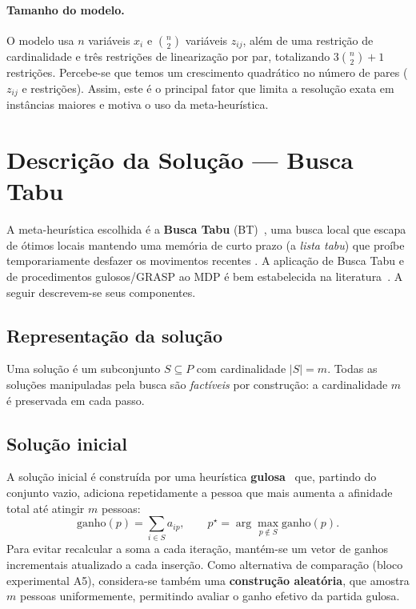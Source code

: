 \documentclass[a4paper,11pt]{article}
\begin{document}
\paragraph{Tamanho do modelo.}
O modelo usa $n$ variáveis $x_i$ e $\binom{n}{2}$ variáveis $z_{ij}$, além de uma
restrição de cardinalidade e três restrições de linearização por par, totalizando
$3\binom{n}{2} + 1$ restrições. Percebe-se que temos um crescimento quadrático no número de pares ($z_{ij}$ e
restrições). Assim, este é o principal fator que limita a resolução exata em instâncias maiores e
motiva o uso da meta-heurística.

\section{Descrição da Solução --- Busca Tabu}
\label{sec:solucao}

A meta-heurística escolhida é a \textbf{Busca Tabu} (BT)~\cite{glover1989tabu,glover1997tabu},
uma busca local que escapa de ótimos locais mantendo uma memória de curto prazo (a
\emph{lista tabu}) que proíbe temporariamente desfazer os movimentos recentes
\cite{hertz1995tutorial,gendreau2003intro,ritt2024inf05010}. A aplicação de Busca Tabu e
de procedimentos gulosos/GRASP ao MDP é bem estabelecida na
literatura~\cite{duarte2007tabu}. A seguir descrevem-se seus componentes.

\subsection{Representação da solução}
Uma solução é um subconjunto $S \subseteq P$ com cardinalidade $|S| = m$. Todas as
soluções manipuladas pela busca são \emph{factíveis} por construção: a cardinalidade
$m$ é preservada em cada passo.

\subsection{Solução inicial}
A solução inicial é construída por uma heurística \textbf{gulosa}~\cite{feo1995greedy} que,
partindo do conjunto vazio, adiciona repetidamente a pessoa que mais aumenta a afinidade
total até atingir $m$ pessoas:
\begin{equation*}
  \text{ganho}(p) = \sum_{i \in S} a_{ip}, \qquad
  p^\star = \arg\max_{p \notin S} \text{ganho}(p).
\end{equation*}
Para evitar recalcular a soma a cada iteração, mantém-se um vetor de ganhos incrementais
atualizado a cada inserção. Como alternativa de comparação (bloco experimental A5),
considera-se também uma \textbf{construção aleatória}, que amostra $m$ pessoas
uniformemente, permitindo avaliar o ganho efetivo da partida gulosa.
\end{document}
